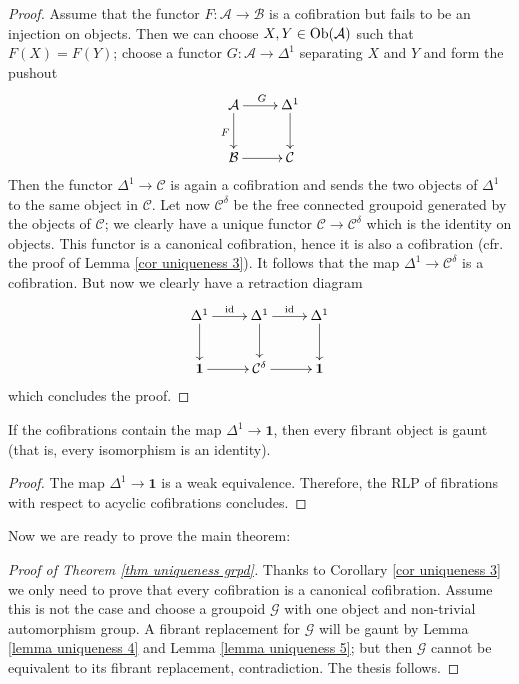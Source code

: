 \begin{proof}
Assume that the functor $F \colon \mathcal A \to \mathcal B$ is a cofibration but fails to be an injection on objects. Then we can choose $X,Y \in \mathrm{Ob}(\mathcal A)$ such that $F(X) = F(Y)$; choose a functor $G \colon \mathcal A \to \Delta^1$ separating $X$ and $Y$ and form the pushout
\[
\xymatrix{
\mathcal A \ar[d]_F \ar[r]^G & \Delta^1 \ar[d] \\ \mathcal B \ar[r] & \mathcal C
}
\]
Then the functor $\Delta^1 \to \mathcal C$ is again a cofibration and sends the two objects of $\Delta^1$ to the same object in $\mathcal C$. Let now $\mathcal C^\delta$ be the free connected groupoid generated by the objects of $\mathcal C$; we clearly have a unique functor $\mathcal C \to \mathcal C^\delta$ which is the identity on objects. This functor is a canonical cofibration, hence it is also a cofibration (cfr. the proof of Lemma \ref{cor uniqueness 3}). It follows that the map $\Delta^1 \to \mathcal C^\delta$ is a cofibration. But now we clearly have a retraction diagram
\[
\xymatrix{
\Delta^1 \ar[r]^{\mathrm{id}} \ar[d] & \Delta^1 \ar[r]^{\mathrm{id}} \ar[d] & \Delta^1 \ar[d] \\ \mathbf 1 \ar[r] & \mathcal C^\delta \ar[r] & \mathbf 1
}
\]
which concludes the proof.
\end{proof}

\begin{lemma} \label{lemma uniqueness 5}
If the cofibrations contain the map $\Delta^1 \to \mathbf 1$, then every fibrant object is gaunt (that is, every isomorphism is an identity).
\end{lemma}

\begin{proof}
The map $\Delta^1 \to \mathbf 1$ is a weak equivalence. Therefore, the RLP of fibrations with respect to acyclic cofibrations concludes.
\end{proof}

Now we are ready to prove the main theorem:

\begin{proof}[Proof of Theorem \ref{thm uniqueness grpd}]
Thanks to Corollary \ref{cor uniqueness 3} we only need to prove that every cofibration is a canonical cofibration. Assume this is not the case and choose a groupoid $\mathcal G$ with one object and non-trivial automorphism group. A fibrant replacement for $\mathcal G$ will be gaunt by Lemma \ref{lemma uniqueness 4} and Lemma \ref{lemma uniqueness 5}; but then $\mathcal G$ cannot be equivalent to its fibrant replacement, contradiction. The thesis follows.
\end{proof}


